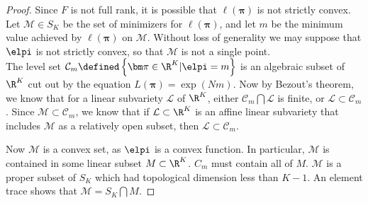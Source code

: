 \begin{proof}%
%
Since $F$ is not full rank, it is possible that $\ell(\bm\pi)$ is not strictly convex.  Let $\mathcal{M}\in S_K$ be the set of minimizers for $\ell(\bm\pi)$, and let $m$ be the minimum value achieved by $\ell(\bm\pi)$ on $\mathcal{M}$.  Without loss of generality we may suppose that $\elpi$ is not strictly convex, so that $\mathcal{M}$ is not a single point.\\
The level set $\mathcal{C}_m \defined \left\{\bm\pi\in\R^K|\elpi =m\right\}$ is an algebraic subset of $\R^{K}$ cut out by the equation $L(\bm\pi)=\exp(Nm)$.  Now by Bezout's theorem, we know that for a linear subvariety $\mathcal{L}$ of $\R^{K}$, either $\mathcal{C}_m\bigcap\mathcal{L}$ is finite, or $\mathcal{L}\subset\mathcal{C}_m$.  Since $\mathcal{M}\subset\mathcal{C}_m$, we know that if $\mathcal{L}\subset\R^K$ is an affine linear subvariety that includes $\mathcal{M}$ as a relatively open subset, then $\mathcal{L}\subset\mathcal{C}_m$.


Now $\mathcal{M}$ is a convex set, as $\elpi$ is a convex function.  In particular, $\mathcal{M}$ is contained in some linear subset $M\subset\R^K$.  $C_m$ must contain all of $M$. $\mathcal{M}$ is a proper subset of $S_K$ which had topological dimension less than $K-1$. An element trace shows that $\mathcal{M}=S_K\bigcap M$.

\end{proof}
